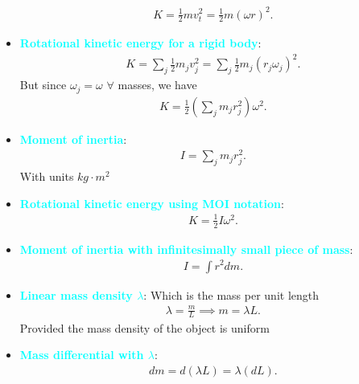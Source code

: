 \documentclass{report}
\begin{document}
\begin{itemize}
            \begin{align*}
                K = \frac{1}{2}mv_{t}^{2} = \frac{1}{2}m(\omega r)^{2}
            .\end{align*}
        \item \textbf{\textcolor{cyan}{Rotational kinetic energy for a rigid body}}:
            \begin{align*}
                K = \sum_j \frac{1}{2}m_{j}v_{j}^{2} = \sum_j\frac{1}{2}m_{j}(r_{j}\omega_{j})^{2}
            .\end{align*}
            But since $\omega_{j} = \omega$ $\forall$ masses, we have
            \begin{align*}
                K = \frac{1}{2}\left(\sum_j m_{j}r_{j}^{2}\right)\omega^{2}
            .\end{align*}
        \item \textbf{\textcolor{cyan}{Moment of inertia}}:
            \begin{align*}
                I = \sum_j m_{j}r_{j}^{2}
            .\end{align*}
            With units $kg \cdot m^{2} $
        \item \textbf{\textcolor{cyan}{Rotational kinetic energy using MOI notation}}:
            \begin{align*}
                K = \frac{1}{2}I\omega^{2}
            .\end{align*}
        \item \textbf{\textcolor{cyan}{Moment of inertia with infinitesimally small piece of mass}}:
            \begin{align*}
                I = \int r^{2}dm
            .\end{align*}
        \item \textbf{\textcolor{cyan}{Linear mass density $\lambda$}}: Which is the mass per unit length
            \begin{align*}
                \lambda = \frac{m}{L} \implies m =\lambda L
            .\end{align*}
            Provided the mass density of the object is uniform
        \item \textbf{\textcolor{cyan}{Mass differential with $\lambda$}}:
            \begin{align*}
                dm = d(\lambda L) = \lambda (dL)
            .\end{align*}
            \bigbreak \noindent 

\end{itemize}
\end{document}
